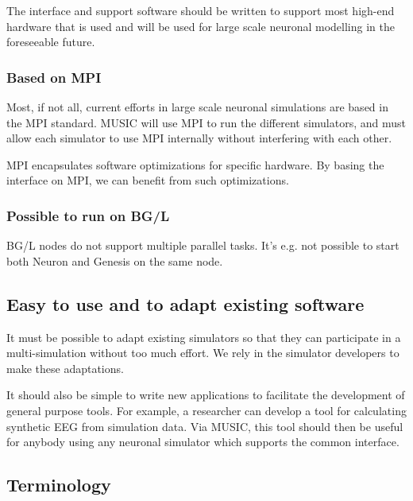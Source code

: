 \documentclass[a4paper]{report}
\begin{document}
The interface and support software should be written to support most
high-end hardware that is used and will be used for large scale
neuronal modelling in the foreseeable future.


\subsubsection{Based on MPI}

Most, if not all, current efforts in large scale neuronal simulations
are based in the MPI standard.  MUSIC will use MPI to run the
different simulators, and must allow each simulator to use MPI
internally without interfering with each other.

MPI encapsulates software optimizations for specific hardware.  By
basing the interface on MPI, we can benefit from such optimizations.


\subsubsection{Possible to run on BG/L}

BG/L nodes do not support multiple parallel tasks.  It's e.g. not
possible to start both Neuron and Genesis on the same node.


\subsection{Easy to use and to adapt existing software}

It must be possible to adapt existing simulators so that they can
participate in a multi-simulation without too much effort.  We rely in
the simulator developers to make these adaptations.

It should also be simple to write new applications to facilitate the
development of general purpose tools.  For example, a researcher can
develop a tool for calculating synthetic EEG from simulation data.
Via MUSIC, this tool should then be useful for anybody using any
neuronal simulator which supports the common interface.


\subsection{Terminology}
\end{document}
